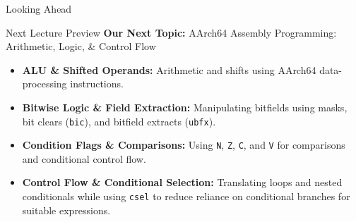 \documentclass[aspectratio=169,11pt,t,xcolor=table]{beamer}
\newcommand{\key}[1]{\textbf{#1}}
\newcommand{\bits}[1]{\texttt{#1}}
\newcommand{\code}[1]{\texttt{#1}}
\begin{document}

\begin{frame}{Looking Ahead}
\vfill
\begin{block}{Next Lecture Preview}
\key{Our Next Topic:} AArch64 Assembly Programming: Arithmetic, Logic, \& Control Flow
\end{block}

\vfill
\begin{itemize}\setlength{\itemsep}{6pt}
  \item \key{ALU \& Shifted Operands:} Arithmetic and shifts using AArch64 data-processing instructions.
  \item \key{Bitwise Logic \& Field Extraction:} Manipulating bitfields using masks, bit clears (\code{bic}), and bitfield extracts (\code{ubfx}).
  \item \key{Condition Flags \& Comparisons:} Using \bits{N}, \bits{Z}, \bits{C}, and \bits{V} for comparisons and conditional control flow.
  \item \key{Control Flow \& Conditional Selection:} Translating loops and nested conditionals while using \code{csel} to reduce reliance on conditional branches for suitable expressions.
\end{itemize}
\vfill
\end{frame}
\end{document}
